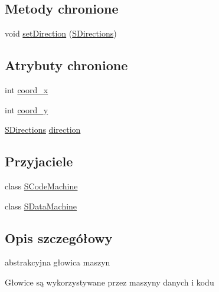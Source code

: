 \subsection*{Metody chronione}
\begin{CompactItemize}
\item 
void \hyperlink{classSAbstractPointer_e1b27cb6a14cbf77e4499d8ca1ae7c90}{setDirection} (\hyperlink{senums_8h_039d4115103dc22e0555ecc968fecbf0}{SDirections})
\end{CompactItemize}
\subsection*{Atrybuty chronione}
\begin{CompactItemize}
\item 
int \hyperlink{classSAbstractPointer_f4a22efc5fe4922cfe61ac8d849d6849}{coord\_\-x}
\item 
int \hyperlink{classSAbstractPointer_8804aa2589dc17c401c438a2f4a1c489}{coord\_\-y}
\item 
\hyperlink{senums_8h_039d4115103dc22e0555ecc968fecbf0}{SDirections} \hyperlink{classSAbstractPointer_6e8b50c6806f43a8b29596c8899db4f2}{direction}
\end{CompactItemize}
\subsection*{Przyjaciele}
\begin{CompactItemize}
\item 
\hypertarget{classSAbstractPointer_13f503f5e1b3625e973ac350880b3a31}{
class \hyperlink{classSAbstractPointer_13f503f5e1b3625e973ac350880b3a31}{SCodeMachine}}
\label{classSAbstractPointer_13f503f5e1b3625e973ac350880b3a31}

\item 
\hypertarget{classSAbstractPointer_b064517f75c184bae39efba1df818a12}{
class \hyperlink{classSAbstractPointer_b064517f75c184bae39efba1df818a12}{SDataMachine}}
\label{classSAbstractPointer_b064517f75c184bae39efba1df818a12}

\end{CompactItemize}


\subsection{Opis szczegółowy}
abstrakcyjna głowica maszyn 

Głowice są wykorzystywane przez maszyny danych i kodu 

